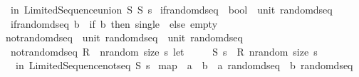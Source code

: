 \begin{isabellebody}
\ \ in\ {\isacharparenleft}{\kern0pt}Limited{\isacharunderscore}{\kern0pt}Sequence{\isachardot}{\kern0pt}union\ S{}\ S{}{\isacharcomma}{\kern0pt}\ s{\isacharprime}{\kern0pt}{\isacharprime}{\kern0pt}{\isacharparenright}{\kern0pt}{\isacharparenright}{\kern0pt}{\isachardoublequoteclose}\isanewline
\isanewline
{}\isamarkupfalse%
\ if{\isacharunderscore}{\kern0pt}random{\isacharunderscore}{\kern0pt}dseq\ {\isacharcolon}{\kern0pt}{\isacharcolon}{\kern0pt}\ {\isachardoublequoteopen}bool\ {\isacharequal}{\kern0pt}{\isachargreater}{\kern0pt}\ unit\ random{\isacharunderscore}{\kern0pt}dseq{\isachardoublequoteclose}\isanewline
{}\isanewline
\ \ {\isachardoublequoteopen}if{\isacharunderscore}{\kern0pt}random{\isacharunderscore}{\kern0pt}dseq\ b\ {\isacharequal}{\kern0pt}\ {\isacharparenleft}{\kern0pt}if\ b\ then\ single\ {\isacharparenleft}{\kern0pt}{\isacharparenright}{\kern0pt}\ else\ empty{\isacharparenright}{\kern0pt}{\isachardoublequoteclose}\isanewline
\isanewline
{}\isamarkupfalse%
\ not{\isacharunderscore}{\kern0pt}random{\isacharunderscore}{\kern0pt}dseq\ {\isacharcolon}{\kern0pt}{\isacharcolon}{\kern0pt}\ {\isachardoublequoteopen}unit\ random{\isacharunderscore}{\kern0pt}dseq\ {\isacharequal}{\kern0pt}{\isachargreater}{\kern0pt}\ unit\ random{\isacharunderscore}{\kern0pt}dseq{\isachardoublequoteclose}\isanewline
{}\isanewline
\ \ {\isachardoublequoteopen}not{\isacharunderscore}{\kern0pt}random{\isacharunderscore}{\kern0pt}dseq\ R\ {\isacharequal}{\kern0pt}\ {\isacharparenleft}{\kern0pt}{\isasymlambda}nrandom\ size\ s{\isachardot}{\kern0pt}\ let\isanewline
\ \ \ \ \ {\isacharparenleft}{\kern0pt}S{\isacharcomma}{\kern0pt}\ s{\isacharprime}{\kern0pt}{\isacharparenright}{\kern0pt}\ {\isacharequal}{\kern0pt}\ R\ nrandom\ size\ s\isanewline
\ \ \ in\ {\isacharparenleft}{\kern0pt}Limited{\isacharunderscore}{\kern0pt}Sequence{\isachardot}{\kern0pt}not{\isacharunderscore}{\kern0pt}seq\ S{\isacharcomma}{\kern0pt}\ s{\isacharprime}{\kern0pt}{\isacharparenright}{\kern0pt}{\isacharparenright}{\kern0pt}{\isachardoublequoteclose}\isanewline
\isanewline
{}\isamarkupfalse%
\ map\ {\isacharcolon}{\kern0pt}{\isacharcolon}{\kern0pt}\ {\isachardoublequoteopen}{\isacharparenleft}{\kern0pt}{\isacharprime}{\kern0pt}a\ {\isacharequal}{\kern0pt}{\isachargreater}{\kern0pt}\ {\isacharprime}{\kern0pt}b{\isacharparenright}{\kern0pt}\ {\isacharequal}{\kern0pt}{\isachargreater}{\kern0pt}\ {\isacharprime}{\kern0pt}a\ random{\isacharunderscore}{\kern0pt}dseq\ {\isacharequal}{\kern0pt}{\isachargreater}{\kern0pt}\ {\isacharprime}{\kern0pt}b\ random{\isacharunderscore}{\kern0pt}dseq{\isachardoublequoteclose}\isanewline

\end{isabellebody}

